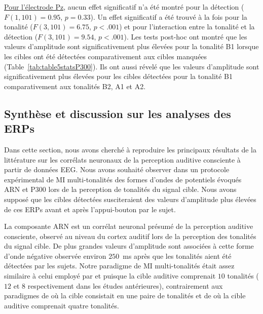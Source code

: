 \underline{Pour l'électrode Pz}, aucun effet significatif n'a été montré pour la détection ($F(1,101)=0.95$, $p=0.33$). 
Un effet significatif a été trouvé à la fois pour la tonalité ($F(3,101)=6.75$, $p<.001$) et pour l'interaction entre la tonalité et la détection ($F(3,101)=9.54$, $p<.001$). 
Les tests post-hoc ont montré que les valeurs d'amplitude sont significativement plus élevées pour la tonalité B1 lorsque les cibles ont été détectées comparativement aux cibles manquées (Table~\ref{tab:table5statsP300}). 
Ils ont aussi révelé que les valeurs d'amplitude sont significativement plus élevées pour les cibles détectées pour la tonalité B1 comparativement aux tonalités B2, A1 et A2. 

\subsection{Synthèse et discussion sur les analyses des ERPs}
\label{etude2analysesERPsyntheseresultats}

Dans cette section, nous avons cherché à reproduire les principaux résultats de la littérature sur les corrélats neuronaux de la perception auditive consciente \citep{dykstra2016neural, giani2015detecting, gutschalk2008neural, wiegand2012correlates} à partir de données EEG. 
Nous avons souhaité observer dans un protocole expérimental de MI multi-tonalités des formes d’ondes de potentiels évoqués ARN et P300 lors de la perception de tonalités du signal cible. 
Nous avons supposé que les cibles détectées susciteraient des valeurs d'amplitude plus élevées de ces ERPs avant et après l'appui-bouton par le sujet. 

La composante ARN est un corrélat neuronal présumé de la perception auditive consciente, observé au niveau du cortex auditif lors de la perception des tonalités du signal cible. 
De plus grandes valeurs d'amplitude sont associées à cette forme d'onde négative observée environ $250$~ms après que les tonalités aient été détectées par les sujets. 
Notre paradigme de MI multi-tonalités était assez similaire à celui employé par \cite{gutschalk2008neural} et \cite{dykstra2016neural} puisque la cible auditive comprenait $10$ tonalités ($12$ et $8$ respectivement dans les études antérieures), contrairement aux paradigmes de \cite{giani2015detecting} où la cible consistait en une paire de tonalités et de \cite{wiegand2012correlates} où la cible auditive comprenait quatre tonalités. 

